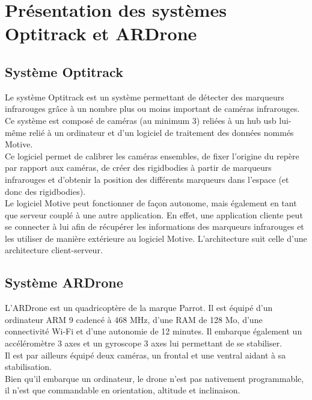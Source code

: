 \chapter{Présentation des systèmes Optitrack et ARDrone}

    \section{Système Optitrack}
        Le système Optitrack est un système permettant de détecter des marqueurs infrarouges grâce à un nombre plus ou moins important de caméras infrarouges. Ce système est composé de caméras (au minimum 3) reliées à un hub usb lui-même relié à un ordinateur et d'un logiciel de traitement des données nommés Motive. \\

        Ce logiciel permet de calibrer les caméras ensembles, de fixer l'origine du repère par rapport aux caméras, de créer des rigidbodies à partir de marqueurs infrarouges et d'obtenir la position des différents marqueurs dans l'espace (et donc des rigidbodies). \\

        Le logiciel Motive peut fonctionner de façon autonome, mais également en tant que serveur couplé à une autre application. En effet, une application cliente peut se connecter à lui afin de récupérer les informations des marqueurs infrarouges et les utiliser de manière extérieure au logiciel Motive. L'architecture suit celle d'une architecture client-serveur.


    \section{Système ARDrone}
       L'ARDrone est un quadricoptère de la marque Parrot. Il est équipé d'un ordinateur ARM 9 cadencé à 468 MHz, d'une RAM de 128 Mo, d'une connectivité Wi-Fi et d'une autonomie de 12 minutes. Il embarque également un accéléromètre 3 axes et un gyroscope 3 axes lui permettant de se stabiliser.\\
Il est par ailleurs équipé deux caméras, un frontal et une ventral aidant à sa stabilisation.\\
 Bien qu'il embarque un ordinateur, le drone n'est pas nativement programmable, il n'est que commandable en orientation, altitude et inclinaison.
